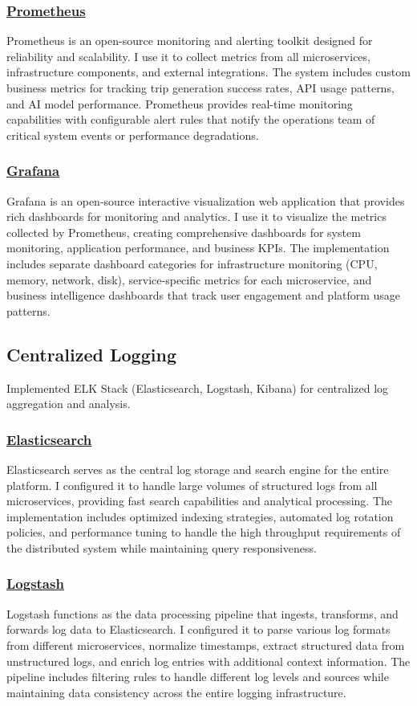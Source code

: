 \subsubsection*{\underline{Prometheus}}
Prometheus is an open-source monitoring and alerting toolkit designed for reliability and scalability. I use it to collect metrics from all microservices, infrastructure components, and external integrations. The system includes custom business metrics for tracking trip generation success rates, API usage patterns, and AI model performance. Prometheus provides real-time monitoring capabilities with configurable alert rules that notify the operations team of critical system events or performance degradations.

\subsubsection*{\underline{Grafana}}
Grafana is an open-source interactive visualization web application that provides rich dashboards for monitoring and analytics. I use it to visualize the metrics collected by Prometheus, creating comprehensive dashboards for system monitoring, application performance, and business KPIs. The implementation includes separate dashboard categories for infrastructure monitoring (CPU, memory, network, disk), service-specific metrics for each microservice, and business intelligence dashboards that track user engagement and platform usage patterns.

\subsection{Centralized Logging}
Implemented ELK Stack (Elasticsearch, Logstash, Kibana) for centralized log aggregation and analysis.

\subsubsection*{\underline{Elasticsearch}}
Elasticsearch serves as the central log storage and search engine for the entire platform. I configured it to handle large volumes of structured logs from all microservices, providing fast search capabilities and analytical processing. The implementation includes optimized indexing strategies, automated log rotation policies, and performance tuning to handle the high throughput requirements of the distributed system while maintaining query responsiveness.

\subsubsection*{\underline{Logstash}}
Logstash functions as the data processing pipeline that ingests, transforms, and forwards log data to Elasticsearch. I configured it to parse various log formats from different microservices, normalize timestamps, extract structured data from unstructured logs, and enrich log entries with additional context information. The pipeline includes filtering rules to handle different log levels and sources while maintaining data consistency across the entire logging infrastructure.

